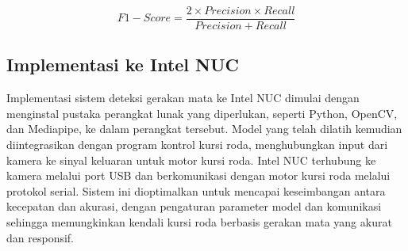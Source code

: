 \begin{equation}
  \label{eq:score}
  F{1}{-}Score=\frac{2 \times Precision \times Recall}{Precision+Recall}
\end{equation}

\subsection{Implementasi ke Intel NUC}

Implementasi sistem deteksi gerakan mata ke Intel NUC dimulai dengan menginstal pustaka perangkat lunak yang diperlukan, seperti Python, OpenCV, dan Mediapipe, ke dalam perangkat tersebut. Model yang telah dilatih kemudian diintegrasikan dengan program kontrol kursi roda, menghubungkan input dari kamera ke sinyal keluaran untuk motor kursi roda. Intel NUC terhubung ke kamera melalui port USB dan berkomunikasi dengan motor kursi roda melalui protokol serial. Sistem ini dioptimalkan untuk mencapai keseimbangan antara kecepatan dan akurasi, dengan pengaturan parameter model dan komunikasi sehingga memungkinkan kendali kursi roda berbasis gerakan mata yang akurat dan responsif.